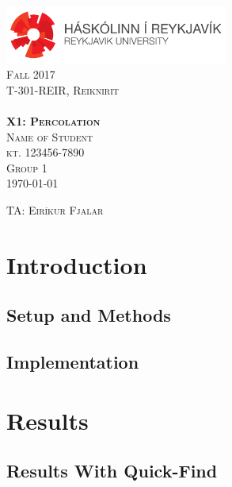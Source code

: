 \documentclass[11pt,a4paper,notitlepage]{article}
\newcommand{\semester}{Fall 2017}
\newcommand{\coursename}{Reiknirit}
\newcommand{\courseid}{T-301-REIR}
\newcommand{\assignment}{X1: Percolation}
\newcommand{\dateofcompilation}{\today}
\newcommand{\ssn}{kt. 123456-7890}              %
\newcommand{\group}{1}
\newcommand{\teachingassistant}{TA: Eiríkur Fjalar}   %
\newcommand{\students}{
    Name of Student                             %
}
\newcommand{\maketitlepage}[1]
{
    \begin{titlepage}

        \begin{center}
            \includegraphics[width=0.55\textwidth]{./rulogo.png}\\[1.5cm]

            \textsc{\huge \semester}\\[0.8cm]

            {\textsc{\Huge \courseid, \coursename}}\\[0.4cm]
            \textsc{\LARGE }\\[2.5cm]

            \textbf{\textsc{\Huge #1}}\\[3cm]


            \textsc{\huge \students}\\[0.4cm]
            \textsc{\LARGE \ssn}\\[0.4cm]
            \textsc{\LARGE Group \group}\\[1cm]
            \textsc{\Large \dateofcompilation}


        \end{center}

        \vfill

        \begin{flushleft}
            \textsc{\Large \teachingassistant}
        \end{flushleft}

    \end{titlepage}
}
\newcommand{\explanation}[1]{}  %
\begin{document}
    \maketitlepage{\assignment}

\explanation{Directions on performing the assignment are showed here in italics (like this). These should not be included in the report you submit.}

 \section{Introduction}
\explanation{  State the objective(s) of the exercise. Ask yourself: Why did I perform the
  experiment? What did I aim to achieve? Provide background about the subject
  matter, as needed (what are union-find data structures good for?). Include
  the purpose of the different equipment and steps.
}

  \subsection{Setup and Methods}
\explanation{ Describe how you performed the exercise. Write about what you actually did
  rather than what you were supposed to do. Be concise. Only give the
  necessary details a person in the same field needs to perform the exercise.
  Write in narrative form (i.e., telling a story) rather than a numbered list
  format. Describe both the set-up (hardware, OS, software, tools) and the testing
  process. Refer to the classes written, but do not include them in the report.}



\subsection{Implementation}
\explanation{Describe how you implemented Percolation.java. How did you check
whether the system percolates?}


\section{Results}
\explanation{Describe the experimental results briefly in words, referring to the tables.}

\subsection{Results With Quick-Find}
\end{document}
